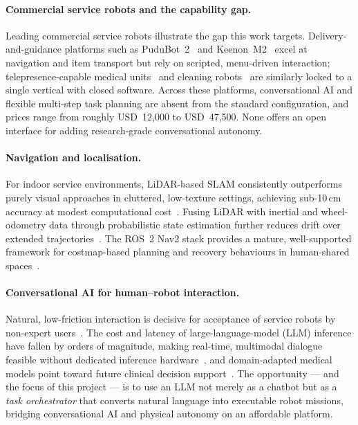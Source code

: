 \documentclass[11pt,a4paper]{article}
\begin{document}
\paragraph{Commercial service robots and the capability gap.}
Leading commercial service robots illustrate the gap this work targets. Delivery-and-guidance platforms such as PuduBot~2~\cite{pudubot2} and Keenon~M2~\cite{m2medical} excel at navigation and item transport but rely on scripted, menu-driven interaction; telepresence-capable medical units~\cite{peanutmedical} and cleaning robots~\cite{puducc1} are similarly locked to a single vertical with closed software. Across these platforms, conversational AI and flexible multi-step task planning are absent from the standard configuration, and prices range from roughly USD~12{,}000 to USD~47{,}500. None offers an open interface for adding research-grade conversational autonomy.

\paragraph{Navigation and localisation.}
For indoor service environments, LiDAR-based SLAM consistently outperforms purely visual approaches in cluttered, low-texture settings, achieving sub-10\,cm accuracy at modest computational cost~\cite{tourani2022}. Fusing LiDAR with inertial and wheel-odometry data through probabilistic state estimation further reduces drift over extended trajectories~\cite{doduc2024,thrun2005probabilistic}. The ROS~2 Nav2 stack provides a mature, well-supported framework for costmap-based planning and recovery behaviours in human-shared spaces~\cite{macenski2022ros2,macenski2023nav2}.

\paragraph{Conversational AI for human--robot interaction.}
Natural, low-friction interaction is decisive for acceptance of service robots by non-expert users~\cite{garingo2016}. The cost and latency of large-language-model (LLM) inference have fallen by orders of magnitude, making real-time, multimodal dialogue feasible without dedicated inference hardware~\cite{google2025pricing}, and domain-adapted medical models point toward future clinical decision support~\cite{medgemini2024}. The opportunity --- and the focus of this project --- is to use an LLM not merely as a chatbot but as a \emph{task orchestrator} that converts natural language into executable robot missions, bridging conversational AI and physical autonomy on an affordable platform.
\end{document}
